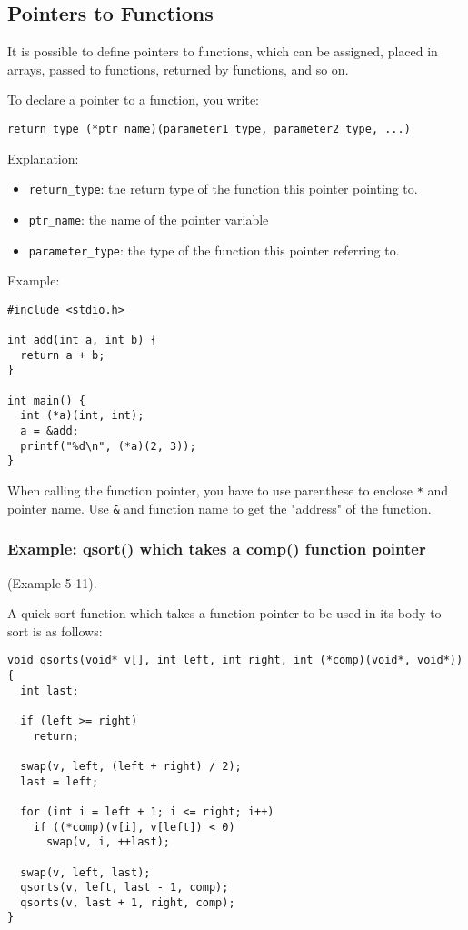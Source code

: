 \documentclass[12pt]{article}
\begin{document}
\subsection{Pointers to Functions}
\label{sec:org855674b}
It is possible to define pointers to functions, which can be assigned, placed in arrays, passed to functions, returned by functions, and so on.

To declare a pointer to a function, you write:
\begin{verbatim}
return_type (*ptr_name)(parameter1_type, parameter2_type, ...)
\end{verbatim}
Explanation:
\begin{itemize}
\item \texttt{return\_type}: the return type of the function this pointer pointing to.
\item \texttt{ptr\_name}: the name of the pointer variable
\item \texttt{parameter\_type}: the type of the function this pointer referring to.
\end{itemize}

Example:
\begin{verbatim}
#include <stdio.h>

int add(int a, int b) {
  return a + b;
}

int main() {
  int (*a)(int, int);
  a = &add;
  printf("%d\n", (*a)(2, 3));
}
\end{verbatim}
When calling the function pointer, you have to use parenthese to enclose \texttt{*} and pointer name. Use \texttt{\&} and function name to get the "address" of the function.

\subsubsection{Example: qsort() which takes a comp() function pointer}
\label{sec:org021b057}
(Example 5-11).

A quick sort function which takes a function pointer to be used in its body to sort is as follows:
\begin{verbatim}
void qsorts(void* v[], int left, int right, int (*comp)(void*, void*)) {
  int last;

  if (left >= right)
    return;

  swap(v, left, (left + right) / 2);
  last = left;

  for (int i = left + 1; i <= right; i++)
    if ((*comp)(v[i], v[left]) < 0)
      swap(v, i, ++last);

  swap(v, left, last);
  qsorts(v, left, last - 1, comp);
  qsorts(v, last + 1, right, comp);
}
\end{verbatim}
\end{document}
